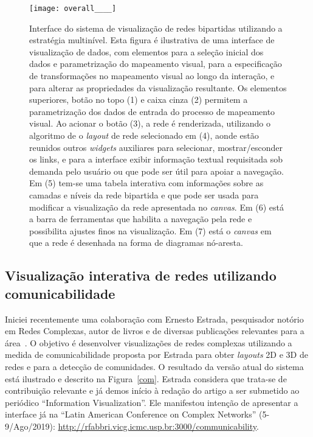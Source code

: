 \documentclass[a4paper, 11pt]{article}
\begin{document}
\begin{figure}[h!]
\centering
  \texttt{[image: overall\_\_\_\_]}
\caption{%
  Interface do sistema de visualização de redes bipartidas utilizando a estratégia multinível.
  Esta figura é ilustrativa de uma interface de visualização de dados, com elementos para a seleção inicial dos dados e parametrização do mapeamento visual, para a especificação de transformações no mapeamento visual ao longo da interação, e para alterar as propriedades da visualização resultante.
  Os elementos superiores, botão no topo (1) e caixa cinza (2) permitem a parametrização dos dados de entrada do processo de mapeamento visual.
  Ao acionar o botão (3), a rede é renderizada, utilizando o algoritmo de o \emph{layout} de rede selecionado em (4), aonde estão reunidos outros \emph{widgets} auxiliares para selecionar,
  mostrar/esconder os links,
  e para a interface exibir informação textual requisitada sob demanda
  pelo usuário ou que pode ser útil para apoiar a navegação.
  Em (5) tem-se uma tabela interativa com informações sobre as camadas e níveis
  da rede bipartida e que pode ser usada para modificar a visualização da rede apresentada no \emph{canvas}.
  Em (6) está a barra de ferramentas que habilita a navegação pela rede e
  possibilita ajustes finos na visualização.
  Em (7) está o \emph{canvas} em que a rede é desenhada na forma de diagramas nó-aresta.
}\label{ml}
\end{figure}

\subsection{Visualização interativa de redes utilizando comunicabilidade}\label{scom}
Iniciei recentemente uma colaboração com Ernesto Estrada, pesquisador notório em Redes Complexas, autor de livros e de diversas publicações relevantes para a área~\cite{ern1,ern2,ern3,ern4}.
O objetivo é desenvolver visualizações de redes complexas utilizando a medida de comunicabilidade proposta por Estrada para obter \textit{layouts} 2D e 3D de redes e para a detecção de comunidades. O resultado da versão atual do sistema está ilustrado e descrito na Figura~\ref{com}.
Estrada considera que trata-se de contribuição relevante e já demos início à redação do artigo a ser submetido ao periódico ``Information Visualization''.
Ele manifestou intenção de apresentar a interface já na ``Latin American Conference on Complex Networks'' (5-9/Ago/2019):
\url{http://rfabbri.vicg.icmc.usp.br:3000/communicability}.
\end{document}
